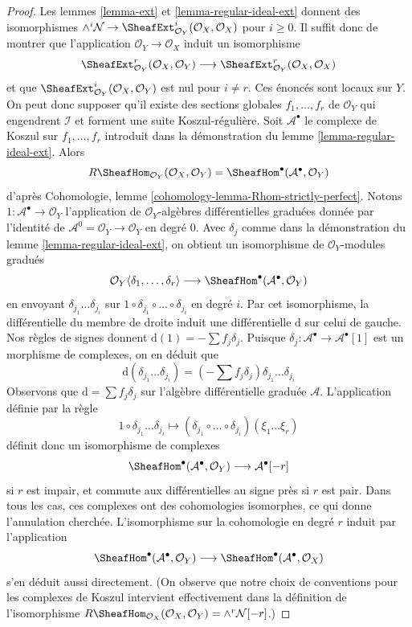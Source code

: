 \begin{proof}
Les lemmes \ref{lemma-ext} et \ref{lemma-regular-ideal-ext} donnent des isomorphismes
$\wedge^i\mathcal{N} \to
\SheafExt^i_{\mathcal{O}_Y}(\mathcal{O}_X, \mathcal{O}_X)$
pour $i \geq 0$. Il suffit donc de montrer que l'application $\mathcal{O}_Y \to \mathcal{O}_X$ induit un isomorphisme
$$
\SheafExt^r_{\mathcal{O}_Y}(\mathcal{O}_X, \mathcal{O}_Y)
\longrightarrow
\SheafExt^r_{\mathcal{O}_Y}(\mathcal{O}_X, \mathcal{O}_X)
$$
et que
$\SheafExt^i_{\mathcal{O}_Y}(\mathcal{O}_X, \mathcal{O}_Y)$
est nul pour $i \not = r$. Ces énoncés sont locaux sur $Y$. On peut donc supposer qu'il existe des sections globales $f_1, \ldots, f_r$ de $\mathcal{O}_Y$ qui engendrent $\mathcal{I}$ et forment une suite Koszul-régulière. Soit $\mathcal{A}^\bullet$ le complexe de Koszul sur $f_1, \ldots, f_r$ introduit dans la démonstration du lemme \ref{lemma-regular-ideal-ext}. Alors
$$
R\SheafHom_{\mathcal{O}_Y}(\mathcal{O}_X, \mathcal{O}_Y) =
\SheafHom^\bullet(\mathcal{A}^\bullet, \mathcal{O}_Y)
$$
d'après Cohomologie, lemme \ref{cohomology-lemma-Rhom-strictly-perfect}. Notons $1 : \mathcal{A}^\bullet \to \mathcal{O}_Y$ l'application de $\mathcal{O}_Y$-algèbres différentielles graduées donnée par l'identité de $\mathcal{A}^0 = \mathcal{O}_Y \to \mathcal{O}_Y$ en degré $0$. Avec $\delta_j$ comme dans la démonstration du lemme \ref{lemma-regular-ideal-ext}, on obtient un isomorphisme de $\mathcal{O}_Y$-modules gradués
$$
\mathcal{O}_Y\langle \delta_1, \ldots, \delta_r\rangle
\longrightarrow
\SheafHom^\bullet(\mathcal{A}^\bullet, \mathcal{O}_Y)
$$
en envoyant $\delta_{j_1} \ldots \delta_{j_i}$ sur $1 \circ \delta_{j_1} \circ \ldots \circ \delta_{j_i}$ en degré $i$. Par cet isomorphisme, la différentielle du membre de droite induit une différentielle $\text{d}$ sur celui de gauche. Nos règles de signes donnent $\text{d}(1) = - \sum f_j \delta_j$. Puisque $\delta_j : \mathcal{A}^\bullet \to \mathcal{A}^\bullet[1]$ est un morphisme de complexes, on en déduit que
$$
\text{d}(\delta_{j_1} \ldots \delta_{j_i}) =
(- \sum f_j \delta_j )\delta_{j_1} \ldots \delta_{j_i}
$$
Observons que $\text{d} = \sum f_j \delta_j$ sur l'algèbre différentielle graduée $\mathcal{A}$. L'application définie par la règle
$$
1 \circ \delta_{j_1} \ldots \delta_{j_i} \longmapsto
(\delta_{j_1} \circ \ldots \circ \delta_{j_i})(\xi_1 \ldots \xi_r)
$$
définit donc un isomorphisme de complexes
$$
\SheafHom^\bullet(\mathcal{A}^\bullet, \mathcal{O}_Y)
\longrightarrow \mathcal{A}^\bullet[-r]
$$
si $r$ est impair, et commute aux différentielles au signe près si $r$ est pair. Dans tous les cas, ces complexes ont des cohomologies isomorphes, ce qui donne l'annulation cherchée. L'isomorphisme sur la cohomologie en degré $r$ induit par l'application
$$
\SheafHom^\bullet(\mathcal{A}^\bullet, \mathcal{O}_Y)
\longrightarrow
\SheafHom^\bullet(\mathcal{A}^\bullet, \mathcal{O}_X)
$$
s'en déduit aussi directement. (On observe que notre choix de conventions pour les complexes de Koszul intervient effectivement dans la définition de l'isomorphisme $R\SheafHom_{\mathcal{O}_X}(\mathcal{O}_X, \mathcal{O}_Y) =
\wedge^r \mathcal{N}[-r]$.)
\end{proof}

